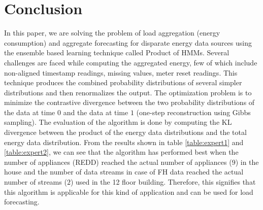 \documentclass{acm_proc_article-sp}
\begin{document}


\section{Conclusion}
\label{conclusion}

In this paper, we are solving the problem of load aggregation (energy consumption) and aggregate forecasting for disparate energy data sources using the ensemble based learning technique called Product of HMMs. Several challenges are faced while computing the aggregated energy, few of which include non-aligned timestamp readings, missing values, meter reset readings. This technique produces the combined probability distributions of several simpler distributions and then renormalizes the output. The optimization problem is to minimize the contrastive divergence between the two probability distributions of the data at time $0$ and the data at time $1$ (one-step reconstruction using Gibbs sampling). The evaluation of the algorithm is done by computing the KL divergence between the product of the energy data distributions and the total energy data distribution.
 From the results shown in table \ref{table:expert1} and \ref{table:expert2}, we can see that the algorithm has performed best when the number of appliances (REDD) reached the actual number of appliances ($9$) in the house and the number of data streams in case of FH data reached the actual number of streams ($2$) used in the 12 floor building. Therefore, this signifies that this algorithm is applicable for this kind of application and can be used for load forecasting.
\end{document}
